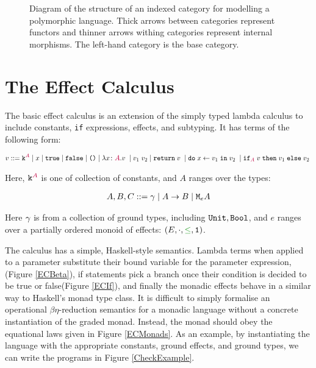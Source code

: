 \documentclass{Report}
\begin{document}
\begin{figure}[ht!]
{
    }
    
    \caption{Diagram of the structure of an indexed category for modelling a polymorphic language. Thick arrows between categories represent functors and thinner arrows withing categories represent internal morphisms. The left-hand category is the base category.
    }
    \label{IndexDiagram}
\end{figure}


\section{The Effect Calculus}
\label{ECDefinition}
The basic effect calculus is an extension of the simply typed lambda calculus to include constants, \texttt{if} expressions, effects, and subtyping. It has terms of the following form:

\begin{align*}
    v ::= \texttt{k}^{\color{purple} A} \mid x\mid \texttt{true} \mid\texttt{false} \mid\texttt{()}\mid\lambda x \colon {\color{purple}A}. v\;\mid v_1\; v_2\mid\texttt{return} \; v\;\mid\texttt{do}\; x \leftarrow v_1 \;\texttt{in}\; v_2\;\mid\texttt{if}_{\textcolor{purple}{A}}\; v\; \texttt{then}\; v_1 \;\texttt{else} \; v_2\; 
\end{align*}

Here, $\texttt{k}^{\color{purple} A}$ is one of collection of constants, and $A$ ranges over the types:

\begin{align*}
    A, B, C ::= \gamma\mid A\rightarrow B \mid\texttt{M}_{e}{A}
\end{align*}

Here $\gamma$ is from a collection of ground types, including $\texttt{Unit}, \texttt{Bool}$, and $e$ ranges over a partially ordered monoid of effects: $(E, \dot, \subeffect, \1)$.

The calculus has a simple, Haskell-style semantics. Lambda terms when applied to a parameter substitute their bound variable for the parameter expression, (Figure \ref{ECBeta}), if statements pick a branch once their condition is decided to be true or false(Figure \ref{ECIf}), and finally the monadic effects behave in a similar way to Haskell's monad type class. It is difficult to simply formalise an operational $\beta\eta$-reduction semantics for a monadic language without a concrete instantiation of the graded monad. Instead, the monad should obey the equational laws given in Figure \ref{ECMonads}. As an example, by instantiating the language with the appropriate constants, ground effects, and ground types, we can write the programs in Figure \ref{CheckExample}.
\end{document}
